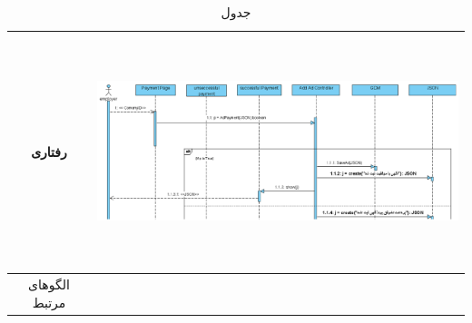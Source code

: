\begin{table}[H]
\begin{adjustbox}{width=\textwidth}
\begin{tabular}{|c|p{\textwidth}|}
\\
\hline
رفتاری & 
\begin{minipage}{\textwidth}
	\begin{flushleft}
		\begin{minipage}{\textwidth}
			\includegraphics[width=13.5cm, height=6cm]{./images/7-1-2}
		\end{minipage}
	\end{flushleft}
\end{minipage}
\\
\hline
الگو‌های مرتبط& \\
\hline
\end{tabular}
\end{adjustbox}
\caption{جدول }
\label{table-with-pic:1}
\end{table}

